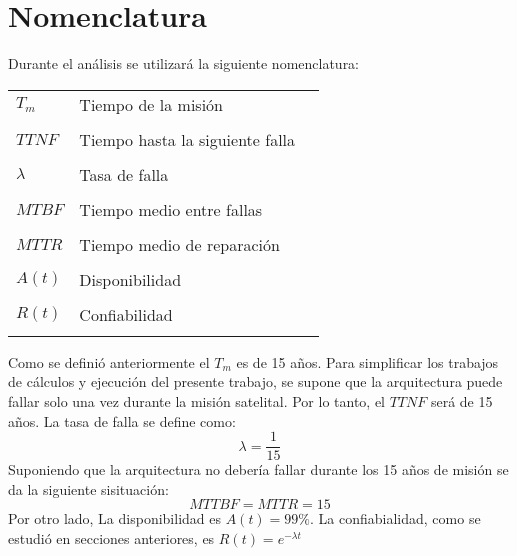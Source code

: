 \section{Nomenclatura}
Durante el análisis se utilizará la siguiente nomenclatura:

\begin{tabular}{p{3cm}l l }

$T_m$       & Tiempo de la misión\\ \\
$TTNF$      & Tiempo hasta la siguiente falla\\ \\
$\lambda$   & Tasa de falla\\ \\
$MTBF$      & Tiempo medio entre fallas\\ \\
$MTTR$      & Tiempo medio de reparación\\ \\
$A(t)$      & Disponibilidad\\ \\
$R(t)$      & Confiabilidad\\ \\

\end{tabular}

Como se definió anteriormente el $T_m$ es de 15 años. Para simplificar los trabajos de cálculos y ejecución del presente trabajo, se supone que la arquitectura puede fallar solo una vez durante la misión satelital. Por lo tanto, el $TTNF$ será de 15 años. La tasa de falla se define como: $$\lambda = \frac{1}{15}$$ Suponiendo que la arquitectura no debería fallar durante los 15 años de misión se da la siguiente sisituación: $$MTTBF = MTTR = 15 $$ Por otro lado, La disponibilidad es $A(t) = 99\%$.
La confiabialidad, como se estudió en secciones anteriores, es $R(t) = e^{- \lambda t}$


